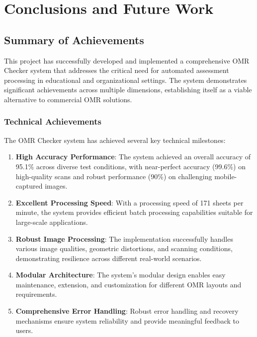 \chapter{Conclusions and Future Work}
\label{ch:conclusions}

\section{Summary of Achievements}

This project has successfully developed and implemented a comprehensive OMR Checker system that addresses the critical need for automated assessment processing in educational and organizational settings. The system demonstrates significant achievements across multiple dimensions, establishing itself as a viable alternative to commercial OMR solutions.

\subsection{Technical Achievements}

The OMR Checker system has achieved several key technical milestones:

\begin{enumerate}
\item \textbf{High Accuracy Performance}: The system achieved an overall accuracy of 95.1\% across diverse test conditions, with near-perfect accuracy (99.6\%) on high-quality scans and robust performance (90\%) on challenging mobile-captured images.

\item \textbf{Excellent Processing Speed}: With a processing speed of 171 sheets per minute, the system provides efficient batch processing capabilities suitable for large-scale applications.

\item \textbf{Robust Image Processing}: The implementation successfully handles various image qualities, geometric distortions, and scanning conditions, demonstrating resilience across different real-world scenarios.

\item \textbf{Modular Architecture}: The system's modular design enables easy maintenance, extension, and customization for different OMR layouts and requirements.

\item \textbf{Comprehensive Error Handling}: Robust error handling and recovery mechanisms ensure system reliability and provide meaningful feedback to users.
\end{enumerate}

